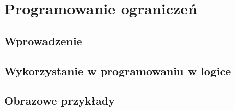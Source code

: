 \chapter{Programowanie ograniczeń}
\thispagestyle{chapterBeginStyle}

\section{Wprowadzenie}

\section{Wykorzystanie w programowaniu w logice}

\section{Obrazowe przykłady}
